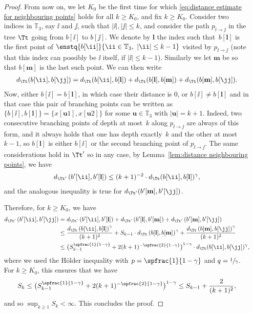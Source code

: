 \begin{proof}
From now on, we let $K_0$ be the first time for which \eqref{eq:distance estimate for neighbouring points} holds for all $k \geq K_0$, and fix $k \geq K_0$.
Consider two indices in $\mathbb{T}_3$, say $\ii$ and $\jj$, such that $|\ii|,|\jj| \leq k$, and consider the path $p_{\ii \to \jj}$ in the tree $\Tt$ going from $b[\ii]$ to $b[\jj]$.
We denote by $\mathbf{l}$ the index such that~$b[\mathbf{l}]$ is the first point of $\enstq{b[\ii]}{ \ii\in \mathbb T_3, \ |\ii| \leq k-1}$ visited by $p_{\ii \to \jj}$ (note that this index can possibly be $\ii$ itself, if $|\ii| \leq k-1$).
Similarly we let $\mathbf{m}$ be so that $b[\mathbf{m}]$ is the last such point.
We can then write
\begin{align*}
d_{\Tt}(b[\ii],b[\jj]) = d_{\Tt}(b[\ii],b[\mathbf{l}])+d_{\Tt}(b[\mathbf{l}],b[\mathbf{m}])+d_{\Tt}(b[\mathbf{m}],b[\jj]).
\end{align*}
Now, either $b[\ii]=b[\mathbf{l}]$, in which case their distance is $0$, or $b[\ii]\neq b[\mathbf{l}]$ and in that case this pair of branching points can be written as $\{b[\ii], b[\mathbf{l}]\} =\{x[\mathbf{u}1],x[\mathbf{u}2]\}$ for some $\mathbf{u}\in \mathbb{T}_3$ with $|\mathbf{u}|=k+1$. Indeed, two consecutive branching points of depth at most~$k$ along $p_{\ii \to \jj}$ are always of this form, and it always holds that one has depth exactly~$k$ and the other at most $k-1$, so $b[\mathbf{l}]$ is either $b[\ii]$ or the second branching point of $p_{\ii \to \jj}$. The same considerations hold in $\Tt'$ so in any case, by Lemma~\ref{lem:distance neighbouring points}, we have
\begin{align*}
d_{\Tt'} \left( b'[\ii],b'[\mathbf{l}] \right) \leq (k+1)^{-2} \cdot d_{\Tt}( b[\ii],b[\mathbf{l}])^\gamma,
\end{align*}
and the analogous inequality is true for $d_{\Tt'}(b'[\mathbf{m}],b'[\jj])$.

Therefore, for $k\geq K_0$, we have
\begin{align*}
d_{\Tt'} \left( b'[\ii],b'[\jj] \right)
&= d_{\Tt'} \left( b'[\ii],b'[\mathbf{l}] \right)+d_{\Tt'} \left( b'[\mathbf{l}],b'[\mathbf{m}] \right)+d_{\Tt'} \left( b'[\mathbf{m}],b'[\jj] \right) \\
&\leq \frac{d_{\Tt} \left( b[\ii],b[\mathbf{l}]\right)^\gamma}{(k+1)^2} + S_{k-1} \cdot d_{\Tt} \left( b[\mathbf{l}],b[\mathbf{m}]\right)^\gamma + \frac{d_{\Tt} \left( b[\mathbf{m}],b[\jj] \right)^\gamma}{(k+1)^2}\\
&\leq \bigl( S_{k-1}^{\spfrac{1}{1-\gamma}} +2(k+1)^{-\spfrac{2}{1-\gamma}} \bigr)^{1-\gamma} \cdot d_{\Tt}( b[\ii],b[\jj])^\gamma,
\end{align*}
where we used the Hölder inequality with $p=\spfrac{1}{1-\gamma}$ and $q=\sfrac{1}{\gamma}$.
For $k \geq K_0$, this ensures that we have
\begin{align*}
S_{k}\leq \bigl( S_{k-1}^{\spfrac{1}{1-\gamma}} +2(k+1)^{-\spfrac{2}{1-\gamma}}\bigr)^{1-\gamma} \leq S_{k-1}+\frac{2}{(k+1)^2},
\end{align*}
and so $\sup_{k\geq 1} S_k<\infty$. This concludes the proof.
\end{proof}


